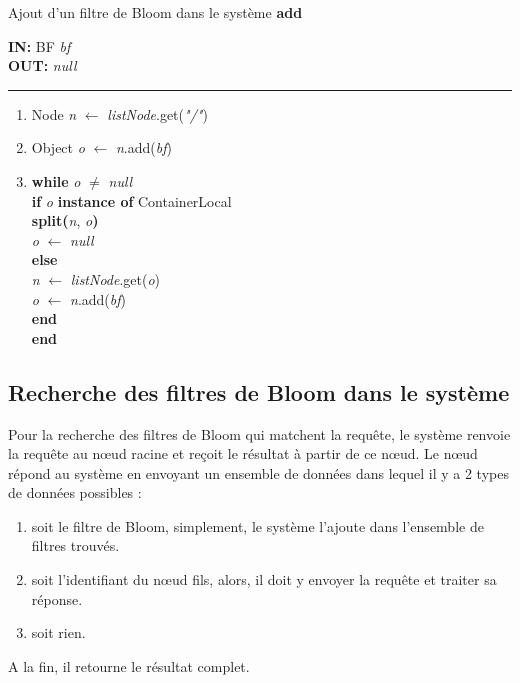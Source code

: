 \documentclass[a4paper,11pt]{report}
\begin{document}
\begin{algorithme}
	Ajout d'un filtre de Bloom dans le système \textbf{add}
\end{algorithme}

\begin{flushleft}
	\begin{framed}
		\textbf{IN:} BF \textit{bf} \\
		\textbf{OUT:} \textit{null}\\
		\noindent\rule{\linewidth}{0.5pt}

		\begin{enumerate}
			\item Node \textit{n} $\leftarrow$ \textit{listNode}.get(\textit{"/"})
			\item Object \textit{o} $\leftarrow$ \textit{n}.add(\textit{bf})
			\item
				\begin{tabbing}
					\textbf{wh}\=\textbf{ile }\=\textit{o} $\neq$ \textit{null}\\
						\> \textbf{if }\= \textit{o} \textbf{instance of} ContainerLocal\\
						\> \> \textbf{split(}\textit{n}, \textit{o}\textbf{)}\\
						\> \> \textit{o} $\leftarrow$ \textit{null}\\
						\> \textbf{else}\\
						\> \> \textit{n} $\leftarrow$ \textit{listNode}.get(\textit{o})\\
						\> \> \textit{o} $\leftarrow$ \textit{n}.add(\textit{bf})\\
						\> \textbf{end}\\
					\textbf{end}
				\end{tabbing}									
		\end{enumerate}	
	\end{framed}
\end{flushleft}
	
\subsection{Recherche des filtres de Bloom dans le système}
	Pour la recherche des filtres de Bloom qui matchent la requête, le système renvoie la requête au nœud racine et reçoit le résultat à partir de ce nœud. Le nœud répond au système en envoyant un ensemble de données dans lequel il y a 2 types de données possibles : 
	\begin{enumerate}
		\item soit le filtre de Bloom, simplement, le système l'ajoute dans l'ensemble de filtres trouvés.
		\item soit l'identifiant du nœud fils, alors, il doit y envoyer la requête et traiter sa réponse.
		\item soit rien.
	\end{enumerate}
	A la fin, il retourne le résultat complet.
\end{document}
